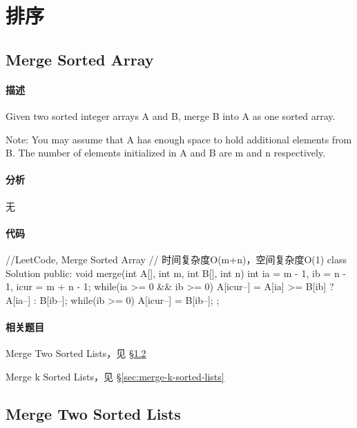 \chapter{排序}

\section{Merge Sorted Array} %
\label{sec:merge-sorted-array}


\subsubsection{描述}
Given two sorted integer arrays A and B, merge B into A as one sorted array.

Note:
You may assume that A has enough space to hold additional elements from B. The number of elements initialized in A and B are m and n respectively.


\subsubsection{分析}
无


\subsubsection{代码}
\begin{Code}
//LeetCode, Merge Sorted Array
// 时间复杂度O(m+n)，空间复杂度O(1)
class Solution {
public:
    void merge(int A[], int m, int B[], int n) {
        int ia = m - 1, ib = n - 1, icur = m + n - 1;
        while(ia >= 0 && ib >= 0) {
            A[icur--] = A[ia] >= B[ib] ? A[ia--] : B[ib--];
        }
        while(ib >= 0) {
            A[icur--] = B[ib--];
        }
    }
};
\end{Code}


\subsubsection{相关题目}
\begindot
\item Merge Two Sorted Lists，见 \S \ref{sec:merge-two-sorted-lists}
\item Merge k Sorted Lists，见 \S \ref{sec:merge-k-sorted-lists}
\myenddot


\section{Merge Two Sorted Lists} %
\label{sec:merge-two-sorted-lists}


